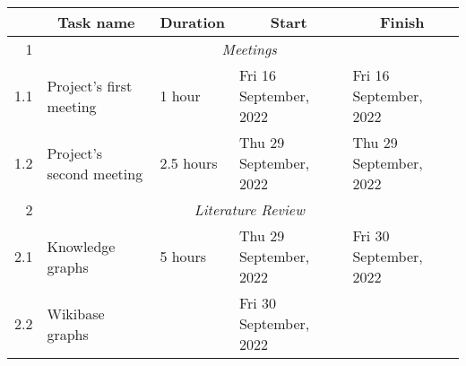 \documentclass{standalone}
\begin{document}
\begin{tabular}{|r|llll|}
    \hline
    \rowcolor[HTML]{C0C0C0}
    \multicolumn{1}{|c|}{\cellcolor[HTML]{C0C0C0}\textbf{ID}} & \multicolumn{1}{c|}{\cellcolor[HTML]{C0C0C0}\textbf{Task name}} & \multicolumn{1}{c|}{\cellcolor[HTML]{C0C0C0}\textbf{Duration}} & \multicolumn{1}{c|}{\cellcolor[HTML]{C0C0C0}\textbf{Start}} & \multicolumn{1}{c|}{\cellcolor[HTML]{C0C0C0}\textbf{Finish}} \\ \hline
    1                                                         & \multicolumn{4}{c|}{\textit{Meetings}}                                                                                                                                                                                                                        \\ \hline
    1.1                                                       & \multicolumn{1}{l|}{Project's first meeting}                    & \multicolumn{1}{l|}{1 hour}                                    & \multicolumn{1}{l|}{Fri 16 September, 2022}                 & Fri 16 September, 2022                                       \\ \hline
    1.2                                                       & \multicolumn{1}{l|}{Project's second meeting}                   & \multicolumn{1}{l|}{2.5 hours}                                 & \multicolumn{1}{l|}{Thu 29 September, 2022}                 & Thu 29 September, 2022                                       \\ \hline
    2                                                         & \multicolumn{4}{c|}{\textit{Literature Review}}                                                                                                                                                                                                               \\ \hline
    2.1                                                       & \multicolumn{1}{l|}{Knowledge graphs}                           & \multicolumn{1}{l|}{5 hours}                                   & \multicolumn{1}{l|}{Thu 29 September, 2022}                 & Fri 30 September, 2022                                       \\ \hline
    2.2                                                       & \multicolumn{1}{l|}{Wikibase graphs}                            & \multicolumn{1}{l|}{}                                          & \multicolumn{1}{l|}{Fri 30 September, 2022}                 &                                                              \\ \hline

\end{tabular}
\end{document}
